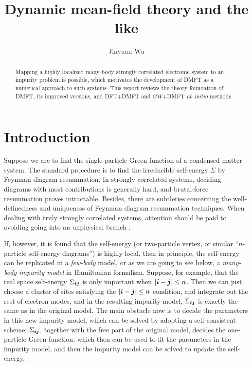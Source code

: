 \documentclass[hyperref, a4paper]{article}
\title{Dynamic mean-field theory and the like}
\author{Jinyuan Wu}
\begin{document}
    
\maketitle

\begin{abstract}
    Mapping a highly localized many-body strongly correlated electronic system 
    to an impurity problem is possible,
    which motivates the development of DMFT
    as a numerical approach to such systems.
    This report reviews the theory foundation of DMFT,
    its improved versions, and DFT+DMFT and $GW$+DMFT \textit{ab initio} methods.
\end{abstract}

\section{Introduction}

Suppose we are to find the single-particle Green function 
of a condensed matter system.
The standard procedure is to find the irreducible self-energy $\Sigma$
by Feynman diagram resummation.
In strongly correlated systems,
deciding diagrams with most contributions is generally hard,
and brutal-force resummation proves intractable.
Besides, there are subtleties 
concerning the well-definedness and uniqueness of Feynman diagram resummation techniques.
When dealing with truly strongly correlated systems,
attention should be paid to avoiding going into an unphysical branch 
\cite{PhysRevLett.119.056402,PhysRevLett.114.156402}.

If, however, it is found that the self-energy 
(or two-particle vertex, or similar ``$n$-particle self-energy diagrams'')
is highly local, 
then in principle,
the self-energy can be replicated in a \emph{few-body} model,
or as we are going to see below,
a \emph{many-body impurity model}
in Hamiltonian formalism.
Suppose, for example, that the real space self-energy $\Sigma_{\vb*{i} \vb*{j}}$ is only important 
when $\abs{\vb*{i} - \vb*{j}} \leq n$.
Then we can just choose a cluster of sites satisfying the $\abs{\vb*{i} - \vb*{j}} \leq n$ condition,
and integrate out the rest of electron modes,
and in the resulting impurity model,
$\Sigma_{\vb*{i} \vb*{j}}$ is exactly the same as in the original model.
The main obstacle now is to decide the parameters in this new impurity model,
which can be solved by adopting a self-consistent scheme:
$\Sigma_{\vb*{i} \vb*{j}}$, together with the free part of the original model,
decides the one-particle Green function,
which then can be used to fit the parameters in the impurity model,
and then the impurity model can be solved to update the self-energy.
\end{document}
